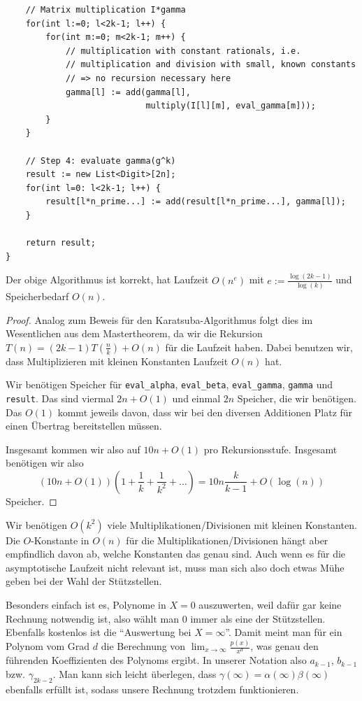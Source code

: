 \begin{algorithm}
\begin{lstlisting}
    // Matrix multiplication I*gamma
    for(int l:=0; l<2k-1; l++) {
        for(int m:=0; m<2k-1; m++) {
            // multiplication with constant rationals, i.e.
            // multiplication and division with small, known constants
            // => no recursion necessary here
            gamma[l] := add(gamma[l],
                            multiply(I[l][m], eval_gamma[m]));
        }
    }

    // Step 4: evaluate gamma(g^k)
    result := new List<Digit>[2n];
    for(int l=0: l<2k-1; l++) {
        result[l*n_prime...] := add(result[l*n_prime...], gamma[l]);
    }

    return result;
}
    \end{lstlisting}
\end{algorithm}

\begin{proposition}
    Der obige Algorithmus ist korrekt, hat Laufzeit $O(n^e)$ mit $e:=\frac{\log(2k-1)}{\log(k)}$ und Speicherbedarf $O(n)$.
\end{proposition}
\begin{proof}
    Analog zum Beweis für den Karatsuba-Algorithmus folgt dies im Wesentlichen aus dem Mastertheorem, da wir die Rekursion $T(n) = (2k-1)T(\frac{n}{k})+O(n)$ für die Laufzeit haben. Dabei benutzen wir, dass Multiplizieren mit kleinen Konstanten Laufzeit $O(n)$ hat.

    Wir benötigen Speicher für \texttt{eval\_alpha}, \texttt{eval\_beta}, \texttt{eval\_gamma}, \texttt{gamma} und \texttt{result}. Das sind viermal $2n+O(1)$ und einmal $2n$ Speicher, die wir benötigen. Das $O(1)$ kommt jeweils davon, dass wir bei den diversen Additionen Platz für einen Übertrag bereitstellen müssen.

    Insgesamt kommen wir also auf $10n+O(1)$ pro Rekursionsstufe. Insgesamt benötigen wir also \[(10n+O(1))\left(1+\frac{1}{k}+\frac{1}{k^2}+\ldots\right) = 10n\frac{k}{k-1}+O(\log(n))\]
    Speicher.
\end{proof}

\begin{remark}
    Wir benötigen $O(k^2)$ viele Multiplikationen/Divisionen mit kleinen Konstanten. Die $O$-Konstante in $O(n)$ für die Multiplikationen/Divisionen hängt aber empfindlich davon ab, welche Konstanten das genau sind. Auch wenn es für die asymptotische Laufzeit nicht relevant ist, muss man sich also doch etwas Mühe geben bei der Wahl der Stützstellen.

    \smallskip
    Besonders einfach ist es, Polynome in $X=0$ auszuwerten, weil dafür gar keine Rechnung notwendig ist, also wählt man $0$ immer als eine der Stützstellen. Ebenfalls kostenlos ist die \enquote{Auswertung bei $X=\infty$}. Damit meint man für ein Polynom vom Grad $d$ die Berechnung von $\lim_{x\to\infty} \frac{p(x)}{x^d}$, was genau den führenden Koeffizienten des Polynoms ergibt. In unserer Notation also $a_{k-1}$, $b_{k-1}$ bzw. $\gamma_{2k-2}$. Man kann sich leicht überlegen, dass $\gamma(\infty)=\alpha(\infty)\beta(\infty)$ ebenfalls erfüllt ist, sodass unsere Rechnung trotzdem funktionieren.
\end{remark}

